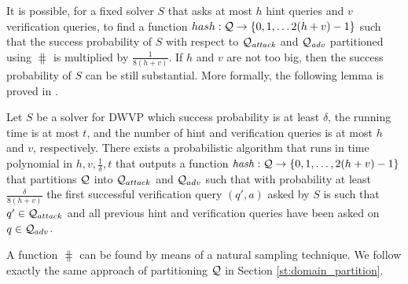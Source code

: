 It is possible, for a fixed solver $S$ that asks at most $h$ hint queries and $v$ verification queries,
to find a function $hash: \mathcal{Q} \rightarrow \{0,1,\dotsc 2(h+v)-1\}$ such that the success probability of $S$ with respect to
$\mathcal{Q}_{\mathit{attack}}$ and $\mathcal{Q}_{\mathit{adv}}$ partitioned using $\hash$ is multiplied by $\frac{1}{8(h+v)}$.
If $h$ and $v$ are not too big, then the success probability of $S$ can be still substantial.
More formally, the following lemma is proved in \cite{dodis2009security}.
\begin{lemma}
  \label{lemma:hash_function_previous}
Let $S$ be a solver for DWVP which success probability is at least $\delta$, the running time is at most $t$,
and the number of hint and verification queries is at most $h$ and $v$, respectively.
There exists a probabilistic algorithm that runs in time polynomial in $h,v,\frac{1}{\delta},t$
that outputs a function $\operatorname{\mathit{hash}} : \mathcal{Q} \rightarrow \{0,1, \dotsc, 2(h+v)-1\}$
that partitions $\mathcal{Q}$ into $\mathcal{Q}_{attack}$ and $\mathcal{Q}_{adv}$ such that
with probability at least $\frac{\delta}{8(h+v)}$ the first successful verification query $(q',a)$ asked by $S$ is such that $q' \in \mathcal{Q}_{attack}$
and all previous hint and verification queries have been asked on $q \in \mathcal{Q}_{adv}$.
\end{lemma}
A function $\hash$ can be found by means of a natural sampling technique.
We follow exactly the same approach of partitioning $\mathcal{Q}$ in Section \ref{st:domain_partition}.

